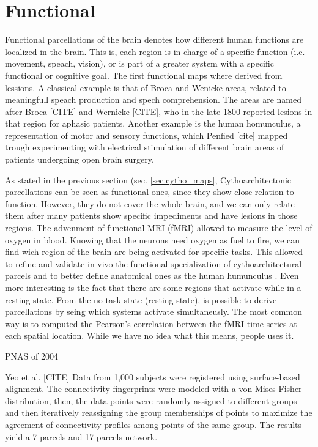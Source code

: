 \section{Functional}
Functional parcellations of the brain denotes how different human functions 
are localized in the brain. This is, each region is in charge of a specific
function (i.e. movement, speach, vision), or is part of a greater system with
a specific functional or cognitive goal. The first functional maps where derived
from lessions. A classical example is that of Broca and Wenicke areas, related
to meaningfull speach production and spech comprehension. The areas are named
after Broca [CITE] and Wernicke [CITE], who in the late 1800 reported lesions in
that region for aphasic patients. Another example is the human homunculus,
a representation of motor and sensory functions, which Penfied [cite] mapped
trough experimenting with electrical stimulation of different brain areas of
patients undergoing open brain surgery.

As stated in the previous section (sec. \ref{sec:cytho_maps}, Cythoarchitectonic
parcellations can be seen as functional ones, since they show close relation 
to function. However, they do not cover the whole brain, and we can only relate
them after many patients show specific impediments and have lesions in those
regions. The advenment of functional MRI (fMRI) allowed to measure the level of
oxygen in blood. Knowing that the neurons need oxygen as fuel to fire, we can
find wich region of the brain are being activated for specific tasks. This
allowed to refine and validate in vivo the functional specialization of 
cythoarchitectural parcels and to better define anatomical ones as the human
humunculus \cite{Lashkari2010, Michel2011}. Even more interesting is the fact
that there are some regions that activate while in a resting state. From the
no-task state (resting state), is possible to derive parcellations by seing
which systems activate simultaneusly. The most common way is to computed the
Pearson's correlation between the fMRI time series at each spatial location.
While we have no idea what this means, people uses it. 

PNAS of 2004 \cite{Johansen-Berg2004}


Yeo et al. [CITE] 
Data from 1,000 subjects were registered using surface-based alignment.
The connectivity fingerprints were modeled with a von Mises-Fisher distribution,
then, the data points were randomly assigned to different groups and then
iteratively reassigning the group memberships of points to maximize the
agreement of connectivity profiles among points of the same group. The results
yield a 7 parcels and 17 parcels network.

